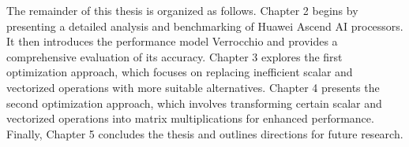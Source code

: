 The remainder of this thesis is organized as follows. Chapter 2 begins by presenting a detailed analysis and benchmarking of Huawei Ascend AI processors. It then introduces the performance model Verrocchio and provides a comprehensive evaluation of its accuracy. Chapter 3 explores the first optimization approach, which focuses on replacing inefficient scalar and vectorized operations with more suitable alternatives. Chapter 4 presents the second optimization approach, which involves transforming certain scalar and vectorized operations into matrix multiplications for enhanced performance. Finally, Chapter 5 concludes the thesis and outlines directions for future research.